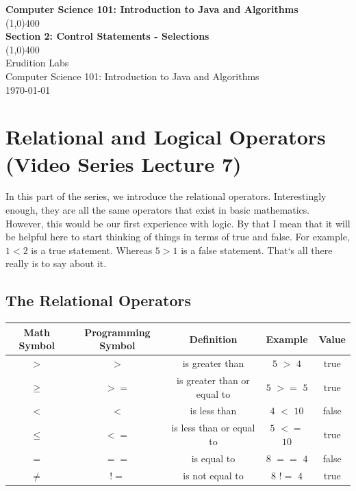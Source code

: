 \documentclass[11]{article}
\begin{document}
\begin{titlepage}
\begin{center}
\vspace{1cm}
\Large{\textbf{Computer Science 101: Introduction to Java and Algorithms}}\\
\vfill
\line(1,0){400}\\
\huge{\textbf{Section 2: Control Statements - Selections}}\\
\line(1,0){400}\\
\vfill
Erudition Labs\\
Computer Science 101: Introduction to Java and Algorithms\\
\today\\
\end{center}
\end{titlepage}

\tableofcontents
\thispagestyle{empty}
\clearpage
\setcounter{page}{1}

\section{Relational and Logical Operators (Video Series Lecture 7)}
In this part of the series, we introduce the relational operators.  Interestingly enough, they are all the same operators that exist in basic mathematics. However, this would be our first experience with logic. By that I mean that it will be helpful here to start thinking of things in terms of true and false. For example, $1<2$ is a true statement. Whereas $5>1$ is a false statement. That`s all there really is to say about it.
\subsection{The Relational Operators}
\begin{center}
  \begin{tabular}{ | c | c | c | c | c |}
    \hline
    Math Symbol & Programming Symbol & Definition & Example & Value \\ \hline
    $>$ & $>$ & is greater than & $5$ $>$ $4$ & true \\ \hline
    $\geq$ & $>=$ & is greater than or equal to & $5$ $>=$ $5$ & true \\ \hline
    $<$ & $<$ & is less than & $4$ $<$ $10$ & false \\ \hline
    $\leq$ & $<=$ & is less than or equal to & $5$ $<=$ $10$ & true \\ \hline
    $=$ & $==$ & is equal to & $8$ $==$  $4$ & false \\ \hline
    $\neq$ & $!=$ & is not equal to & $8$ $!=$  $4$ & true \\ 
    \hline
  \end{tabular}
\end{center}
\end{document}
